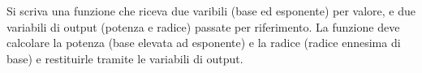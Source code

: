 \begin{Exercise}[label={ex:operazioni_rif}]
    Si scriva una funzione che riceva due varibili (base ed esponente) per valore, e due variabili di output (potenza e radice)
    passate per riferimento. La funzione deve calcolare la potenza (base elevata ad esponente) e la radice (radice ennesima di base) e restituirle
    tramite le variabili di output.
\end{Exercise}

\begin{Answer}[ref={ex:operazioni_rif}]
  	
\end{Answer}